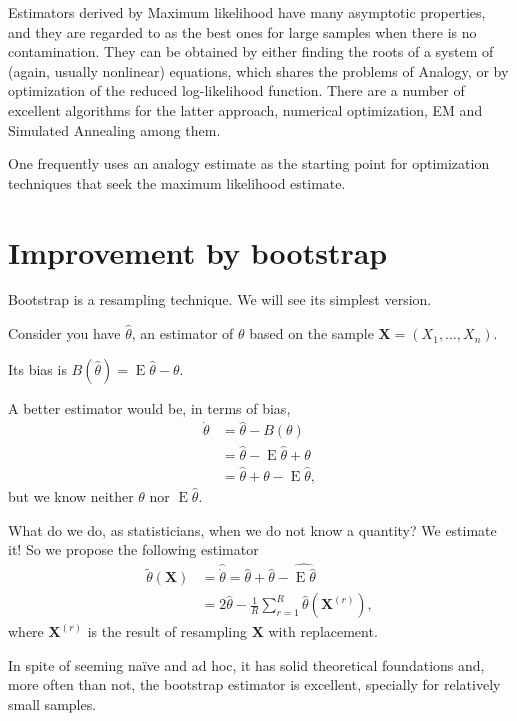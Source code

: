 Estimators derived by Maximum likelihood have many asymptotic properties, and they are regarded to as the best ones for large samples when there is no contamination.
They can be obtained by either finding the roots of a system of (again, usually nonlinear) equations, which shares the problems of Analogy, or by optimization of the reduced log-likelihood function.
There are a number of excellent algorithms for the latter approach, numerical optimization\cite{maxLik}, EM and Simulated Annealing among them.

One frequently uses an analogy estimate as the starting point for optimization techniques that seek the maximum likelihood estimate.

\section{Improvement by bootstrap}

Bootstrap is a resampling technique.
We will see its simplest version.

Consider you have $\widehat{\theta}$, an estimator of $\theta$ based on the sample $\bm X=(X_1,\dots,X_n)$.

Its bias is $B(\widehat{\theta})=\operatorname{E}\widehat{\theta}-\theta$.

A better estimator would be, in terms of bias,
\begin{align}
\dot{\theta}	&=\widehat{\theta}-B(\theta)\\
				&=\widehat{\theta}- \operatorname{E}\widehat{\theta}+\theta\nonumber\\
				&=\widehat{\theta}+\theta-\operatorname{E}\widehat{\theta},
\end{align}
but we know neither $\theta$ nor $\operatorname{E}\widehat{\theta}$.

What do we do, as statisticians, when we do not know a quantity?
We estimate it!
So we propose the following estimator
\begin{align}
\widetilde{\theta}(\bm X) &= \widehat{\dot{\theta}} = \widehat{\theta} + \widehat{\theta} - \widehat{\operatorname{E}\widehat{\theta}} \nonumber\\
 &= 2\widehat{\theta} - \frac1R\sum_{r=1}^{R} \widehat{\theta}(\bm X^{(r)}),
\end{align}
where $\bm X^{(r)}$ is the result of resampling $\bm X$ with replacement.

In spite of seeming na\"ive and ad hoc, it has solid theoretical foundations and, more often than not, the bootstrap estimator is excellent, specially for relatively small samples\cite{CribariFrerySilva:CSDA,%
VasconcellosFrerySilva:CompStat,%
SilvaCribariFrery:ImprovedLikelihood:Environmetrics}.

